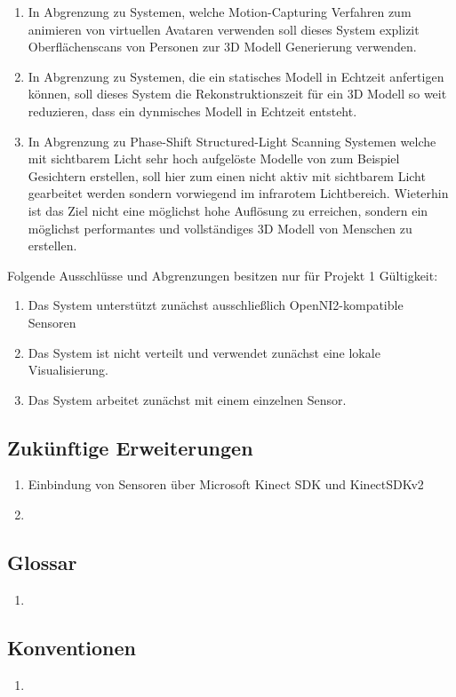 \begin{enumerate}
	\item In Abgrenzung zu Systemen, welche Motion-Capturing Verfahren zum animieren von virtuellen Avataren verwenden soll dieses System explizit Oberflächenscans von Personen zur 3D Modell Generierung verwenden.
	\item In Abgrenzung zu Systemen, die ein statisches Modell in Echtzeit anfertigen können, soll dieses System die Rekonstruktionszeit für ein 3D Modell so weit reduzieren, dass ein dynmisches Modell in Echtzeit entsteht.
	\item In Abgrenzung zu Phase-Shift Structured-Light Scanning Systemen welche mit sichtbarem Licht sehr hoch aufgelöste Modelle von zum Beispiel Gesichtern erstellen, soll hier zum einen nicht aktiv mit sichtbarem Licht gearbeitet werden sondern vorwiegend im infrarotem Lichtbereich. Wieterhin ist das Ziel nicht eine möglichst hohe Auflösung zu erreichen, sondern ein möglichst performantes und vollständiges 3D Modell von Menschen zu erstellen.
\end{enumerate}

Folgende Ausschlüsse und Abgrenzungen besitzen nur für Projekt 1 Gültigkeit:

\begin{enumerate}
	\item Das System unterstützt zunächst ausschließlich OpenNI2-kompatible Sensoren
	\item Das System ist nicht verteilt und verwendet zunächst eine lokale Visualisierung.
	\item Das System arbeitet zunächst mit einem einzelnen Sensor.
\end{enumerate}

\subsection{Zukünftige Erweiterungen}

\begin{enumerate}
	\item Einbindung von Sensoren über Microsoft Kinect SDK und KinectSDKv2
	\item 
\end{enumerate}

\subsection{Glossar}

\begin{enumerate}
	\item
\end{enumerate}

\subsection{Konventionen}

\begin{enumerate}
	\item
\end{enumerate}